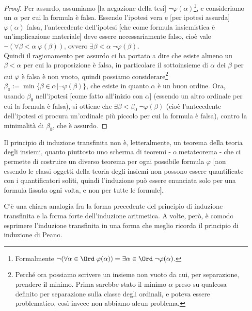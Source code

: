 \documentclass[11pt]{scrartcl}
\begin{document}
\begin{proof}
	Per assurdo, assumiamo [la negazione della tesi] $\neg \varphi(\alpha)$\footnote{Formalmente $\neg(\forall \alpha \in\Ord\;\varphi(\alpha)) = \exists \alpha \in \Ord \;\neg\varphi(\alpha)$.}, e consideriamo un $\alpha$ per cui la formula è falsa.
	Essendo l'ipotesi vera e [per ipotesi assurda] $\varphi(\alpha)$ falsa, l'antecedente dell'ipotesi [che come formula insiemistica è un'implicazione materiale] deve essere necessariamente falso, cioè vale $\neg (\forall \beta < \alpha \; \varphi(\beta))$, ovvero $\exists \beta < \alpha \; \neg \varphi(\beta)$.\\
	Quindi il ragionamento per assurdo ci ha portato a dire che esiste almeno un $\beta < \alpha$ per cui la proposizione è falsa, in particolare il sottoinsieme di $\alpha$ dei $\beta$ per cui $\varphi$ è falsa è non vuoto, quindi possiamo considerare\footnote{Perché
	ora possiamo scrivere un insieme non vuoto da cui, per separazione, prendere il minimo. Prima sarebbe stato il minimo $\alpha$ preso su qualcosa definito per separazione sulla classe degli ordinali, e poteva essere problematico, così invece non abbiamo alcun problema.} $\beta_0 := \min \{\beta \in \alpha | \neg\varphi(\beta)\}$, che esiste in quanto $\alpha$ è un buon ordine.
	Ora, usando $\beta_0$ nell'ipotesi [come fatto all'inizio con $\alpha$] (essendo un altro ordinale per cui la formula è falsa), si ottiene che $\exists \beta < \beta_0 \; \neg \varphi(\beta)$ (cioè l'antecedente dell'ipotesi ci procura un'ordinale più piccolo per cui la formula è falsa), contro la minimalità di $\beta_0$, che è assurdo.
\end{proof}

\begin{note}
	Il principio di induzione transfinita non è, letteralmente, un teorema della teoria degli insiemi, quanto piuttosto uno scherma di teoremi - o metateorema - che ci permette 
	di costruire un diverso teorema per ogni possibile formula $\varphi$ [non essendo le classi oggetti della teoria degli insiemi non possono essere quantificate con i quantificatori soliti, quindi l'induzione può
	essere enunciata solo per una formula fissata ogni volta, e non per tutte le formule].
\end{note}

C'è una chiara analogia fra la forma precedente del principio di induzione transfinita e la forma forte dell'induzione aritmetica.
A volte, però, è comodo esprimere l'induzione transfinita in una forma che meglio ricorda il principio di induzione di Peano.
\end{document}
